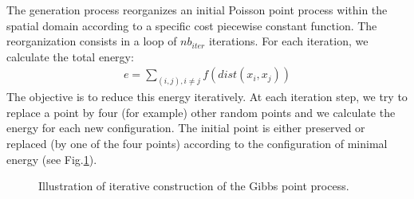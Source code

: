 %
The generation process reorganizes an initial Poisson point process within the spatial domain according to a specific cost piecewise 
constant function. The reorganization consists in a loop of $nb_{iter}$ iterations.
For each iteration, we calculate the total energy:
\begin{eqnarray}
e=\displaystyle\sum_{(i,j), i\neq j}f(dist(x_i,x_j))
\end{eqnarray}
The objective is to reduce this energy iteratively. At each  iteration step, we try to replace a point by four (for example) other random points and we 
calculate the energy for each new configuration. The initial point is either preserved or replaced (by one of the four points) according to the 
configuration of minimal energy (see Fig.\ref{fig:point_process_generation:enonce:gibbs}).
 
\begin{figure}[htbp]
 \centering\caption{Illustration of iterative construction of the Gibbs point process.}%
 \hfill
 \hfill
 \hfill
 \label{fig:point_process_generation:enonce:gibbs}%
\end{figure}


